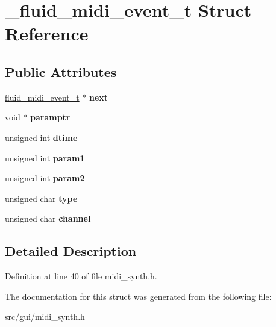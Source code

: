 \hypertarget{struct__fluid__midi__event__t}{\section{\-\_\-fluid\-\_\-midi\-\_\-event\-\_\-t Struct Reference}
\label{struct__fluid__midi__event__t}
}
\subsection*{Public Attributes}
\begin{DoxyCompactItemize}
\item 
\hypertarget{struct__fluid__midi__event__t_a0d5ef7528dfa953132fb2e2471bffac0}{\hyperlink{struct__fluid__midi__event__t}{fluid\-\_\-midi\-\_\-event\-\_\-t} $\ast$ {\bfseries next}}\label{struct__fluid__midi__event__t_a0d5ef7528dfa953132fb2e2471bffac0}

\item 
\hypertarget{struct__fluid__midi__event__t_afe5a9dc57be21c06319331d0ff048fc2}{void $\ast$ {\bfseries paramptr}}\label{struct__fluid__midi__event__t_afe5a9dc57be21c06319331d0ff048fc2}

\item 
\hypertarget{struct__fluid__midi__event__t_a95a5caa12570905e7b06eddd73474bd9}{unsigned int {\bfseries dtime}}\label{struct__fluid__midi__event__t_a95a5caa12570905e7b06eddd73474bd9}

\item 
\hypertarget{struct__fluid__midi__event__t_a94018711464160be5a5ffe6c20dcebbc}{unsigned int {\bfseries param1}}\label{struct__fluid__midi__event__t_a94018711464160be5a5ffe6c20dcebbc}

\item 
\hypertarget{struct__fluid__midi__event__t_af5db43d718e962503b7e4e3298c3c026}{unsigned int {\bfseries param2}}\label{struct__fluid__midi__event__t_af5db43d718e962503b7e4e3298c3c026}

\item 
\hypertarget{struct__fluid__midi__event__t_a3fcf1f8cc634a3e0e36788ab58a604a8}{unsigned char {\bfseries type}}\label{struct__fluid__midi__event__t_a3fcf1f8cc634a3e0e36788ab58a604a8}

\item 
\hypertarget{struct__fluid__midi__event__t_a6cbaf2dd7f396262752b29ca097baa40}{unsigned char {\bfseries channel}}\label{struct__fluid__midi__event__t_a6cbaf2dd7f396262752b29ca097baa40}

\end{DoxyCompactItemize}


\subsection{Detailed Description}


Definition at line 40 of file midi\-\_\-synth.\-h.



The documentation for this struct was generated from the following file\-:\begin{DoxyCompactItemize}
\item 
src/gui/midi\-\_\-synth.\-h\end{DoxyCompactItemize}
